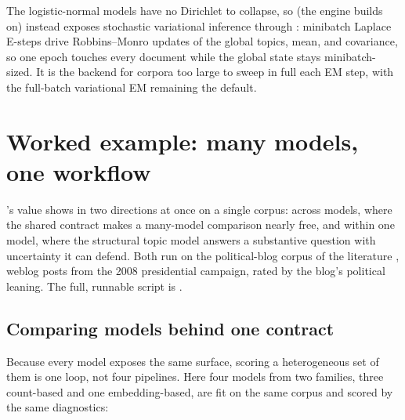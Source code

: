 \documentclass[article,nojss]{jss}
\begin{document}
The logistic-normal models have no Dirichlet to collapse, so  (the
engine  builds on) instead exposes stochastic variational inference
\citep{hoffman2013svi} through : minibatch Laplace
E-steps drive Robbins--Monro updates of the global topics, mean, and
covariance, so one epoch touches every document while the global state stays
minibatch-sized. It is the backend for corpora too large to sweep in full
each EM step, with the full-batch variational EM remaining the default.

\section{Worked example: many models, one workflow}\label{sec:example}

's value shows in two directions at once on a single corpus: across
models, where the shared contract makes a many-model comparison nearly free, and
within one model, where the structural topic model answers a substantive question
with uncertainty it can defend. Both run on the political-blog corpus of the 
literature \citep{roberts2016model}, weblog posts from the 2008 
presidential campaign, rated by the blog's political leaning. The full, runnable
script is .

\subsection{Comparing models behind one contract}

Because every model exposes the same surface, scoring a heterogeneous set of them
is one loop, not four pipelines. Here four models from two families, three
count-based and one embedding-based, are fit on the same corpus and scored by the
same diagnostics:
\end{document}

